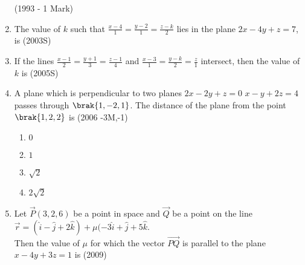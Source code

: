 \begin{enumerate}
\begin{enumerate}
\end{enumerate}
\hfill (1993 - 1 Mark)
\item The value of $k$ such that $\frac{x-4}{1}=\frac{y-2}{1}=\frac{z-k}{2}$ lies in the plane $2x-4y+z=7$, is
\hfill (2003S)
\begin{enumerate}
\end{enumerate}
\item If the lines $\frac{x-1}{2}=\frac{y+1}{3}=\frac{z-1}{4}$ and $\frac{x-3}{1}=\frac{y-k}{2}=\frac{z}{1}$ intersect, then the value of $k$ is 
\hfill (2005S)
\begin{enumerate}
\end{enumerate}
    \item A plane which is perpendicular to two planes $2x-2y+z=0$  $x-y+2z=4$ passes through $\brak{1,-2,1}$. The distance of the plane from the point $\brak{1,2,2}$ is
    \hfill{(2006 -3M,-1)}
    \begin{multicols}{2} 
    	\begin{enumerate}
    		\item $0$
    		\item $1$
    		\item $\sqrt{2}$
    		\item $2\sqrt{2}$
    	\end{enumerate}
    \end{multicols}
    \item Let $\vec{P}(3,2,6)$ be a point in space and $\vec{Q}$ be a point on the line \\ 
    $\vec{r} = (\hat{i} - \hat{j} + 2\hat{k}) + \mu(-3\hat{i} +\hat{j}+5\hat{k}.$
    \\ Then the value of $\mu$ for which the vector $\overrightarrow{PQ}$ is parallel to the plane $x-4y+3z=1$ is
    \hfill{(2009)}
    \begin{multicols}{2}

\end{multicols}
\end{enumerate}
